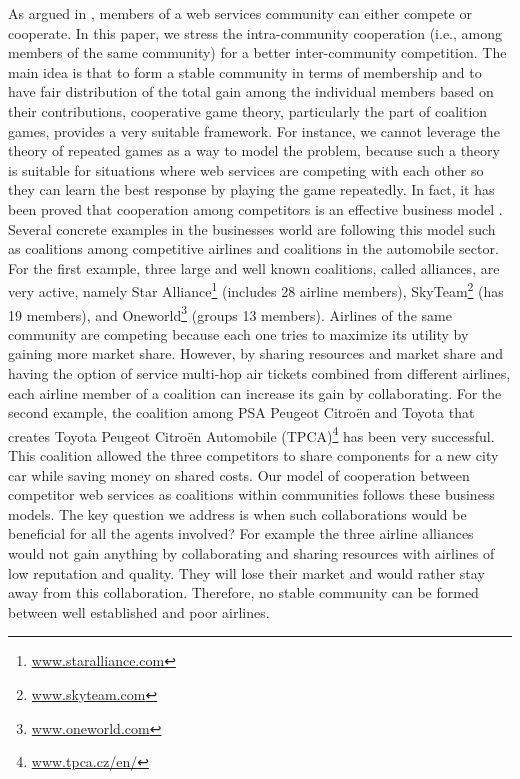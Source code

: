 \documentclass[10pt,journal,cspaper,compsoc]{IEEEtran}
\begin{document}
As argued in \cite{CSTintercommunity}, members of a web services
community can either compete or cooperate. In this paper, we
stress the intra-community cooperation (i.e., among members of the
same community) for a better inter-community competition. The main
idea is that to form a stable community in terms of membership and
to have fair distribution of the total gain among the individual
members based on their contributions, cooperative game theory,
particularly the part of coalition games, provides a very suitable
framework. For instance, we cannot leverage the theory of repeated
games as a way to model the problem, because such a theory is
suitable for situations where web services are competing with each
other so they can learn the best response by playing the game
repeatedly. In fact, it has been proved that cooperation among
competitors is an effective business model
\cite{Chetty2003,Bucklin1993}. Several concrete examples in the
businesses world are following this model such as coalitions among
competitive airlines and coalitions in the automobile sector. For
the first example, three large and well known coalitions, called
alliances, are very active, namely Star
Alliance\footnote{\url{www.staralliance.com}} (includes 28 airline
members), SkyTeam\footnote{\url{www.skyteam.com}} (has 19
members), and Oneworld\footnote{\url{ www.oneworld.com}} (groups
13 members). Airlines of the same community are competing because
each one tries to maximize its utility by gaining more market
share. However, by sharing resources and market share and having
the option of service multi-hop air tickets combined from
different airlines, each airline member of a coalition can
increase its gain by collaborating. For the second example, the
coalition among PSA Peugeot Citro\"{e}n and Toyota that creates
Toyota Peugeot Citro\"{e}n Automobile
(TPCA)\footnote{\url{www.tpca.cz/en/}} has been very successful.
This coalition allowed the three competitors to share components
for a new city car while saving money on shared costs. Our model
of cooperation between competitor web services as coalitions
within communities follows these business models. The key question
we address is when such collaborations would be beneficial for all
the agents involved? For example the three airline alliances would
not gain anything by collaborating and sharing resources with
airlines of low reputation and quality. They will lose their
market and would rather stay away from this collaboration.
Therefore, no stable community can be formed between well
established and poor airlines.
\end{document}
